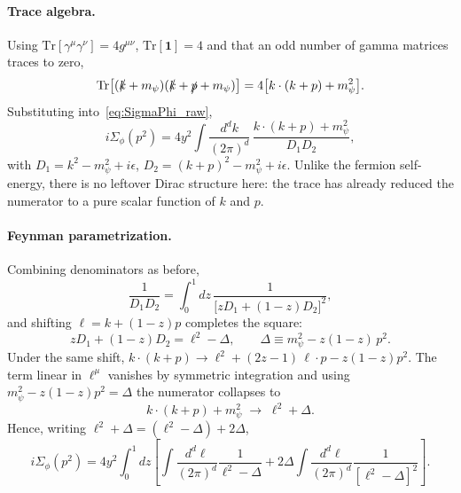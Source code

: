 \documentclass[a4paper, 11pt]{article}
\begin{document}
\paragraph{Trace algebra.} Using $\mathrm{Tr}[\gamma^\mu\gamma^\nu]=4g^{\mu\nu}$, $\mathrm{Tr}[\textbf{1}]=4$ and that an odd number of gamma matrices traces to zero,
\begin{equation}
    \mathrm{Tr}\big[(\slashed{k}+m_\psi)(\slashed{k}+\slashed{p}+m_\psi)\big]
    = 4\big[k\cdot(k+p) + m_\psi^2\big].
    \label{eq:trace_numerator}
\end{equation}
Substituting into~\eqref{eq:SigmaPhi_raw},
\begin{equation*}
    i\Sigma_\phi(p^2) = 4y^2\int\frac{d^dk}{(2\pi)^d}\,
    \frac{k\cdot(k+p)+m_\psi^2}{D_1 D_2},
\end{equation*}
with $D_1 = k^2-m_\psi^2+i\epsilon$, $D_2 = (k+p)^2-m_\psi^2+i\epsilon$. Unlike the fermion self-energy, there is no leftover Dirac structure here: the trace has already reduced the numerator to a pure scalar function of $k$ and $p$.

\paragraph{Feynman parametrization.} Combining denominators as before,
\begin{equation*}
    \frac{1}{D_1 D_2} = \int_0^1 dz\,\frac{1}{\big[z D_1+(1-z) D_2\big]^2},
\end{equation*}
and shifting $\ell = k+(1-z)p$ completes the square:
\begin{equation*}
    z D_1+(1-z) D_2 = \ell^2-\Delta, \qquad
    \Delta \equiv m_\psi^2 - z(1-z)\,p^2.
\end{equation*}
Under the same shift, $k\cdot(k+p) \to \ell^2 + (2z-1)\,\ell\cdot p - z(1-z)p^2$. The term linear in $\ell^\mu$ vanishes by symmetric integration and using $m_\psi^2-z(1-z)p^2=\Delta$ the numerator collapses to
\begin{equation*}
    k\cdot(k+p)+m_\psi^2 \;\longrightarrow\; \ell^2+\Delta.
\end{equation*}
Hence, writing $\ell^2+\Delta = (\ell^2-\Delta)+2\Delta$,
\begin{equation*}
    i\Sigma_\phi(p^2) = 4y^2\int_0^1 dz\left[\int\frac{d^d\ell}{(2\pi)^d}\frac{1}{\ell^2-\Delta}
    + 2\Delta\int\frac{d^d\ell}{(2\pi)^d}\frac{1}{[\ell^2-\Delta]^2}\right].
\end{equation*}
\end{document}
